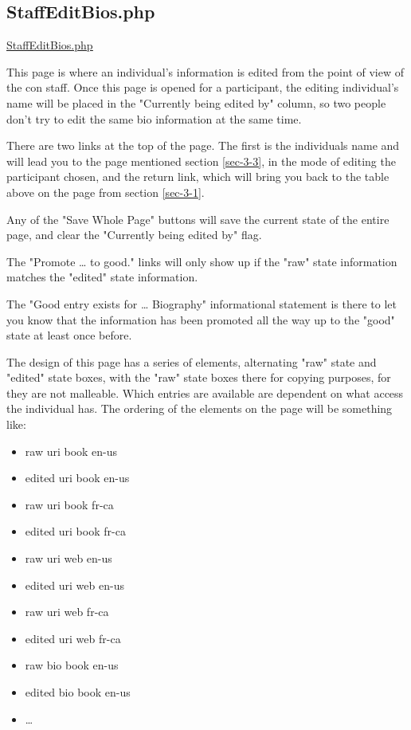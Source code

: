 \documentclass[captions=tablesignature]{scrartcl}
\begin{document}
\subsection{StaffEditBios.php}
\label{sec-3-2}
\label{StaffEditBios.php}
\underline{
\href{../webpages/StaffEditBios.php}{StaffEditBios.php}
}

This page is where an individual's information is edited from the
point of view of the con staff.  Once this page is opened for a
participant, the editing individual's name will be placed in the
"Currently being edited by" column, so two people don't try to edit
the same bio information at the same time.

There are two links at the top of the page.  The first is the
individuals name and will lead you to the page mentioned section
\ref{sec-3-3}, in the mode of editing the
participant chosen, and the return link, which will bring you back
to the table above on the page from section \ref{sec-3-1}.

Any of the "Save Whole Page" buttons will save the current state of
the entire page, and clear the "Currently being edited by" flag.

The "Promote \ldots{} to good." links will only show up if the "raw"
state information matches the "edited" state information.

The "Good entry exists for \ldots{} Biography" informational statement
is there to let you know that the information has been promoted all
the way up to the "good" state at least once before.

The design of this page has a series of elements, alternating "raw"
state and "edited" state boxes, with the "raw" state boxes there
for copying purposes, for they are not malleable.  Which entries
are available are dependent on what access the individual has.  The
ordering of the elements on the page will be something like:
\begin{itemize}
\item raw uri book en-us
\item edited uri book en-us
\item raw uri book fr-ca
\item edited uri book fr-ca
\item raw uri web en-us
\item edited uri web en-us
\item raw uri web fr-ca
\item edited uri web fr-ca
\item raw bio book en-us
\item edited bio book en-us
\item \ldots{}
\end{itemize}
\end{document}
